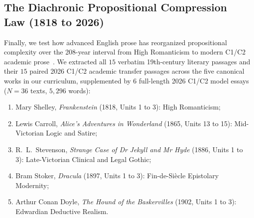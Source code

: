 \documentclass[11pt,reqno]{article}
\begin{document}
\subsection{The Diachronic Propositional Compression Law (1818 to 2026)}

Finally, we test how advanced English prose has reorganized propositional complexity over the 208-year interval from High Romanticism to modern C1/C2 academic prose~\cite{BiberGray2010}. We extracted all $15$ verbatim 19th-century literary passages and their $15$ paired 2026 C1/C2 academic transfer passages across the five canonical works in our curriculum, supplemented by $6$ full-length 2026 C1/C2 model essays ($N=36$ texts, $5,296$ words):
\begin{enumerate}
    \item Mary Shelley, \emph{Frankenstein} (1818, Units 1 to 3): High Romanticism;
    \item Lewis Carroll, \emph{Alice's Adventures in Wonderland} (1865, Units 13 to 15): Mid-Victorian Logic and Satire;
    \item R.\ L.\ Stevenson, \emph{Strange Case of Dr Jekyll and Mr Hyde} (1886, Units 1 to 3): Late-Victorian Clinical and Legal Gothic;
    \item Bram Stoker, \emph{Dracula} (1897, Units 1 to 3): Fin-de-Si\`ecle Epistolary Modernity;
    \item Arthur Conan Doyle, \emph{The Hound of the Baskervilles} (1902, Units 1 to 3): Edwardian Deductive Realism.
\end{enumerate}
\end{document}
